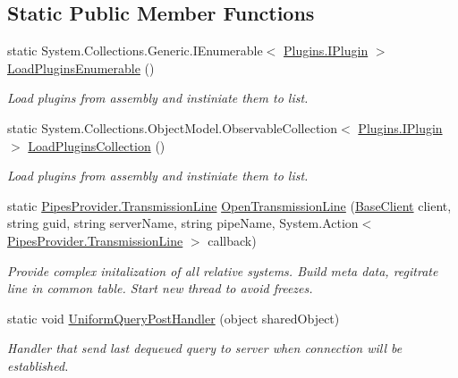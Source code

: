 \subsection*{Static Public Member Functions}
\begin{DoxyCompactItemize}
\item 
static System.\+Collections.\+Generic.\+I\+Enumerable$<$ \mbox{\hyperlink{interface_uniform_client_1_1_plugins_1_1_i_plugin}{Plugins.\+I\+Plugin}} $>$ \mbox{\hyperlink{class_uniform_client_1_1_base_client_aa60dbfa5bd8c46659aec7738193315f1}{Load\+Plugins\+Enumerable}} ()
\begin{DoxyCompactList}\small\item\em Load plugins from assembly and instiniate them to list. \end{DoxyCompactList}\item 
static System.\+Collections.\+Object\+Model.\+Observable\+Collection$<$ \mbox{\hyperlink{interface_uniform_client_1_1_plugins_1_1_i_plugin}{Plugins.\+I\+Plugin}} $>$ \mbox{\hyperlink{class_uniform_client_1_1_base_client_a99ae0bb1dd5bef374fcedb3f873bfe8b}{Load\+Plugins\+Collection}} ()
\begin{DoxyCompactList}\small\item\em Load plugins from assembly and instiniate them to list. \end{DoxyCompactList}\item 
static \mbox{\hyperlink{class_pipes_provider_1_1_transmission_line}{Pipes\+Provider.\+Transmission\+Line}} \mbox{\hyperlink{class_uniform_client_1_1_base_client_a9c59b23626ff132aa96630654d7bc410}{Open\+Transmission\+Line}} (\mbox{\hyperlink{class_uniform_client_1_1_base_client}{Base\+Client}} client, string guid, string server\+Name, string pipe\+Name, System.\+Action$<$ \mbox{\hyperlink{class_pipes_provider_1_1_transmission_line}{Pipes\+Provider.\+Transmission\+Line}} $>$ callback)
\begin{DoxyCompactList}\small\item\em Provide complex initalization of all relative systems. Build meta data, regitrate line in common table. Start new thread to avoid freezes. \end{DoxyCompactList}\item 
static void \mbox{\hyperlink{class_uniform_client_1_1_base_client_acd2e71dcb27e97f900f887233e6b8f9c}{Uniform\+Query\+Post\+Handler}} (object shared\+Object)
\begin{DoxyCompactList}\small\item\em Handler that send last dequeued query to server when connection will be established. \end{DoxyCompactList}\item 

\end{DoxyCompactItemize}

